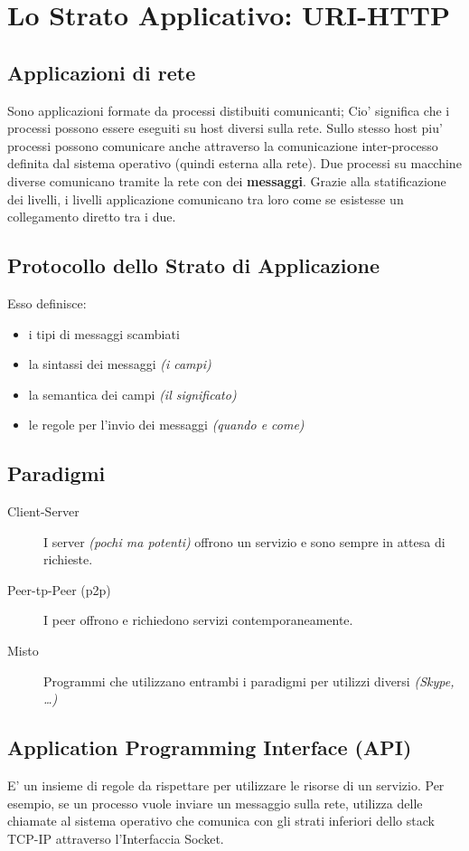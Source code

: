 \chapter{Lo Strato Applicativo: URI-HTTP}
\section{Applicazioni di rete}
Sono applicazioni formate da processi distibuiti comunicanti; Cio' significa che i processi possono essere eseguiti su host diversi sulla rete.
Sullo stesso host piu' processi possono comunicare anche attraverso la {\color{blue}comunicazione inter-processo} definita dal sistema operativo (quindi esterna alla rete).
Due processi su macchine diverse comunicano tramite la rete con dei \textbf{\color{blue} messaggi}.
Grazie alla statificazione dei livelli, i livelli applicazione comunicano tra loro come se esistesse un collegamento diretto tra i due.
\section{Protocollo dello Strato di Applicazione}
Esso definisce:
\begin{itemize}
    \item i tipi di messaggi scambiati
    \item la sintassi dei messaggi \textit{(i campi)}
    \item la semantica dei campi \textit{(il significato)}
    \item le regole per l'invio dei messaggi \textit{(quando e come)}
\end{itemize}
\newpage
\section{Paradigmi}
\begin{description}
    \item[Client-Server] I server \textit{(pochi ma potenti)} offrono un servizio e sono sempre in attesa di richieste.
    \item[Peer-tp-Peer (p2p)]  I peer offrono e richiedono servizi contemporaneamente.
    \item[Misto] Programmi che utilizzano entrambi i paradigmi per utilizzi diversi \textit{(Skype, \dots)} 
\end{description}
\section{Application Programming Interface (API)}
E' un insieme di regole da rispettare per utilizzare le risorse di un servizio.
Per esempio, se un processo vuole inviare un messaggio sulla rete, utilizza delle chiamate al sistema operativo che comunica con gli strati inferiori dello stack TCP-IP attraverso l'{\color{blue}Interfaccia Socket}.
